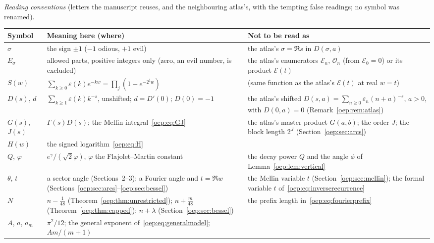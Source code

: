 \documentclass[11pt,letterpaper]{article}
\theoremstyle{remark}\newtheorem{remark}[theorem]{Remark}
\newcommand{\eps}{\varepsilon}
\begin{document}
\medskip\noindent\begin{minipage}{\textwidth}
\emph{Reading conventions} (letters the manuscript reuses, and the
neighbouring atlas's, with the tempting false readings; no symbol was renamed).\par
\smallskip
\begingroup\small\renewcommand{\arraystretch}{1.1}
\noindent\begin{tabular}{@{}>{\raggedright\arraybackslash}p{0.95in}>{\raggedright\arraybackslash}p{3.1in}>{\raggedright\arraybackslash}p{2.05in}@{}}
\toprule
Symbol & Meaning here (where) & Not to be read as\\
\midrule
$\sigma$ & the sign $\pm1$ ($-1$ odious, $+1$ evil) & the atlas's $\sigma=\Re s$ in $D(\sigma,a)$\\
$E_\sigma$ & allowed parts, positive integers only (zero, an evil number, is excluded) & the atlas's enumerators $\mathcal E_n$, $\mathcal O_n$ (from $\mathcal E_0=0$) or its product $\mathcal E(t)$\\
$S(w)$ & $\sum_{k\ge0}\eps(k)e^{-kw}=\prod_j(1-e^{-2^jw})$ & (same function as the atlas's $\mathcal E(t)$ at real $w=t$)\\
$D(s)$, $d$ & $\sum_{k\ge1}\eps(k)k^{-s}$, unshifted; $d=D'(0)$; $D(0)=-1$ & the atlas's shifted $D(s,a)=\sum_{n\ge0}\eps_n(n+a)^{-s}$, $a>0$, with $D(0,a)=0$ (Remark~\ref{oep:rem:atlas})\\
$G(s)$, $J(s)$ & $\Gamma(s)D(s)$; the Mellin integral~\eqref{oep:eq:GJ} & the atlas's master product $G(a,b)$; the order $J$; the block length $2^J$ (Section~\ref{oep:sec:arcs})\\
$H(w)$ & the signed logarithm~\eqref{oep:eq:H} & \\
$Q$, $\varphi$ & $e^\gamma/(\sqrt2\varphi)$, $\varphi$ the Flajolet--Martin constant & the decay power $Q$ and the angle $\phi$ of Lemma~\ref{oep:lem:vertical}\\
$\theta$, $t$ & a sector angle (Sections~2--3); a Fourier angle and $t=\Re w$ (Sections~\ref{oep:sec:arcs}--\ref{oep:sec:bessel}) & the Mellin variable $t$ (Section~\ref{oep:sec:mellin}); the formal variable $t$ of~\eqref{oep:eq:inverserecurrence}\\
$N$ & $n-\frac1{48}$ (Theorem~\ref{oep:thm:unrestricted}); $n+\frac m{48}$ (Theorem~\ref{oep:thm:capped}); $n+\lambda$ (Section~\ref{oep:sec:bessel}) & the prefix length in~\eqref{oep:eq:fourierprefix}\\
$A$, $a$, $a_m$ & $\pi^2/12$; the general exponent of~\eqref{oep:eq:generalmodel}; $Am/(m+1)$ & \\

\end{tabular}
\end{minipage}
\end{document}
